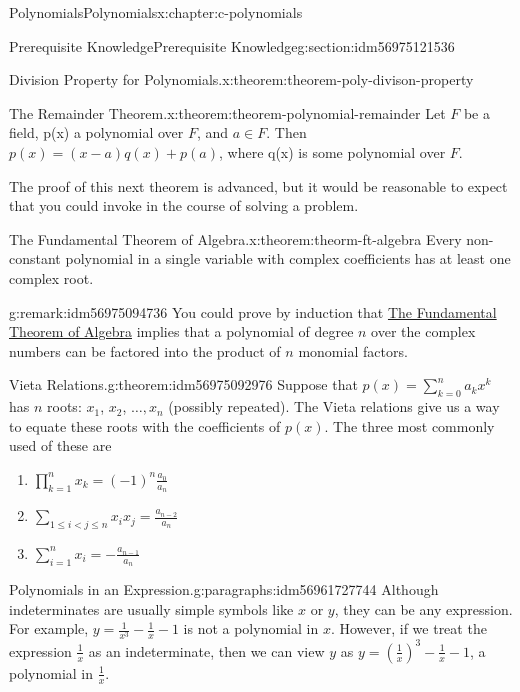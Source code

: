 \documentclass[twoside,10pt,]{book}
\numberwithin{equation}{section}
\newcommand{\lt}{<}
\begin{document}
\begin{chapterptx}{Polynomials}{}{Polynomials}{}{}{x:chapter:c-polynomials}
\begin{sectionptx}{Prerequisite Knowledge}{}{Prerequisite Knowledge}{}{}{g:section:idm56975121536}
\begin{theorem}{Division Property for Polynomials.}{}{x:theorem:theorem-poly-divison-property}
\end{theorem}
\begin{theorem}{The Remainder Theorem.}{}{x:theorem:theorem-polynomial-remainder}%
%
Let \(F\) be a field, p(x) a polynomial over \(F\), and \(a \in  F\). Then \(p(x) = (x-a)q(x) + p(a)\), where q(x) is some polynomial over \(F\).%
\end{theorem}
The proof of this next theorem is advanced, but it would be reasonable to expect that you could invoke in the course of solving a problem.%
\begin{theorem}{The  Fundamental Theorem of Algebra.}{}{x:theorem:theorm-ft-algebra}%
%
Every non-constant polynomial in a single variable with complex coefficients has at least one complex root.%
\end{theorem}
\begin{remark}{}{g:remark:idm56975094736}%
You could prove by induction that \hyperref[x:theorem:theorm-ft-algebra]{The  Fundamental Theorem of Algebra} implies that a polynomial of degree \(n\) over the complex numbers can be factored into the product of \(n\) monomial factors.%
\end{remark}
\begin{theorem}{Vieta Relations.}{}{g:theorem:idm56975092976}%
%
Suppose that  \(p(x) = \sum_{k=0}^n a_k x^k\) has \(n\) roots: \(x_1\), \(x_2\), \(\ldots , x_n\) (possibly repeated).  The Vieta relations give us a way to equate these roots with the coefficients of \(p(x)\). The three most commonly used of these are%
\begin{enumerate}
\item{}\(\displaystyle \prod_{k=1}^n x_k = (-1)^n \frac{a_0}{a_n}\)%
\item{}\(\displaystyle \sum_{1\le i \lt j\le n} x_i x_j = \frac{a_{n-2}}{a_n}\)%
\item{}\(\displaystyle \sum_{i=1}^n x_i = - \frac{a_{n-1}}{a_n}\)%
\end{enumerate}
%
\end{theorem}
\begin{paragraphs}{Polynomials in an Expression.}{g:paragraphs:idm56961727744}%
Although indeterminates are usually simple symbols like \(x\) or \(y\), they can be any expression. For example, \(y =\frac{1}{x^3}-\frac{1}{x} -1\) is not a polynomial in \(x\).  However, if we treat the expression \(\frac{1}{x}\) as an indeterminate, then we can view \(y\) as  \(y =(\frac{1}{x})^3-\frac{1}{x} -1\), a polynomial in \(\frac{1}{x}\).%

\end{paragraphs}
\end{sectionptx}
\end{chapterptx}
\end{document}
